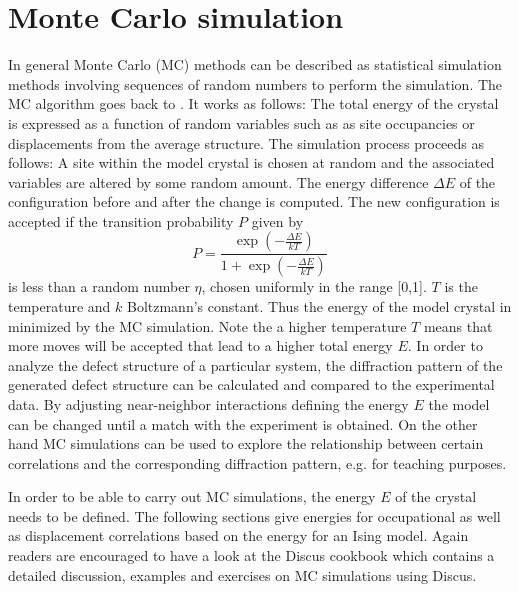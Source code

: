 
\chapter{Monte Carlo simulation \label{mc}}

In general Monte Carlo (MC) methods can be described as statistical
simulation methods involving sequences of random numbers to perform
the simulation. The MC algorithm goes back to \citet{merorotete53}.
It works as follows: The total energy of the crystal is expressed as
a function of random variables such as as site occupancies or
displacements from the average structure. The simulation process
proceeds as follows: A site within the model crystal is chosen at
random and the associated variables are altered by some random
amount.  The energy difference $\Delta E$ of the configuration
before and after the change is computed.  The new configuration is
accepted if the transition probability $P$ given by
%
\begin{equation}
    P = \frac { \exp ( - \frac {\Delta E } { kT } ) }
              { 1 + \exp ( - \frac {\Delta E } { kT } ) }
    \label{mc-eq1}
\end{equation}
%
is less than a random number $\eta$, chosen uniformly in the range
[0,1]. $T$ is the temperature and $k$ Boltzmann's constant. Thus the
energy of the model crystal in minimized by the MC simulation. Note
the a higher temperature $T$ means that more moves will be accepted
that lead to a higher total energy $E$. In order to analyze the
defect structure of a particular system, the diffraction pattern of
the generated defect structure can be calculated and compared to the
experimental data. By adjusting near-neighbor interactions defining
the energy $E$ the model can be changed until a match with the
experiment is obtained. On the other hand MC simulations can be used
to explore the relationship between certain correlations and the
corresponding diffraction pattern, e.g. for teaching purposes. \par

In order to be able to carry out MC simulations, the energy $E$ of
the crystal needs to be defined.  The following sections give
energies for occupational as well as displacement correlations based
on the energy for an Ising model. Again readers are encouraged to
have a look at the Discus cookbook \citep{nedpro} which
contains a detailed discussion, examples and exercises on MC
simulations using Discus. \par

